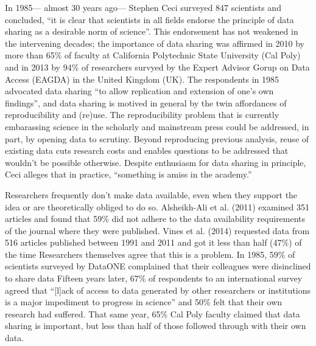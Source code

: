 \documentclass[10pt]{article}
\begin{document}
In 1985--- almost 30 years ago--- Stephen Ceci surveyed 847 scientists and concluded, ``it is clear that scientists in all fields endorse the principle of data sharing as a desirable norm of science''\cite{ceci_scientists_1988}.
This endorsement has not weakened in the intervening decades; the importance of data sharing was affirmed in 2010 by more than 65\% of faculty at California Polytechnic State University (Cal Poly)\cite{scaramozzino_study_2012} and in 2013 by 94\% of researchers survyed by the Expert Advisor Gorup on Data Access (EAGDA) in the United Kingdom (UK)\cite{bobrow_establishing_2014}.
The respondents in 1985 advocated data sharing ``to allow replication and extension of one's own findings''\cite{ceci_scientists_2014}, and data sharing is motived in general by the twin affordances of reproducibility and (re)use.
The reproducibility problem that is currently embarassing science in the scholarly\cite{ioannidis_why_2005, prinz_believe_2011, mobley_survey_2013} and mainstream\cite{zimmer_rise_2013, _how_2013, _trouble_2013} press could be addressed, in part, by opening data to scrutiny\cite{drew_lost_2013, collins_policy_2014}.
Beyond reproducing previous analysis, reuse of existing data cuts research costs\cite{piwowar_data_2011} and enables questions to be addressed that wouldn't be possible otherwise\cite{FIND_SOMETHING}.
Despite enthusiasm for data sharing in principle, Ceci alleges that in practice, ``something is amiss in the academy.''

Researchers frequently don't make data available, even when they support the idea or are theoretically obliged to do so.
Alsheikh-Ali et al. (2011) examined 351 articles and found that 59\% did not adhere to the data availability requirements of the journal where they were published.
Vines et al. (2014) requested data from 516 articles published between 1991 and 2011 and got it less than half (47\%) of the time\cite{vines_availability_2014}
Researchers themselves agree that this is a problem.
In 1985, 59\% of scientists surveyed by DataONE complained that their colleagues were disinclined to share data\cite{ceci_scientists_1988}
Fifteen years later, 67\% of respondents to an international survey agreed that ``[l]ack of access to data generated by other researchers or institutions is a major impediment to progress in science'' and 50\% felt that their own research had suffered\cite{tenopir_data_2011}.
That same year, 65\% Cal Poly faculty claimed that data sharing is important, but less than half of those followed through with their own data\cite{scaramozzino_study_2012}.
\end{document}
